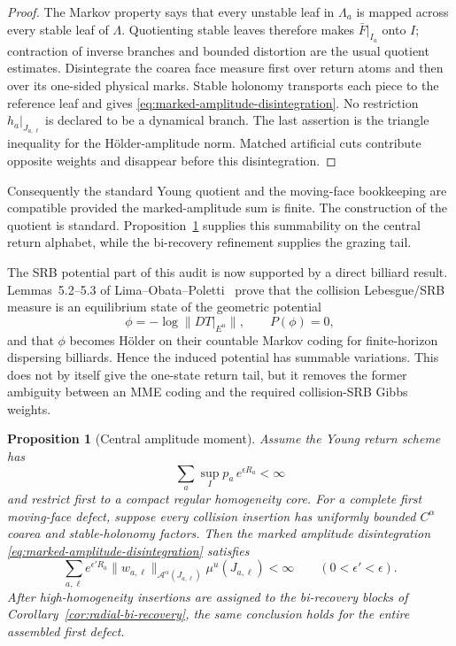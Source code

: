 \documentclass[11pt]{article}
\newtheorem{proposition}[theorem]{Proposition}
\begin{document}
\begin{proof}
The Markov property says that every unstable leaf in $\Lambda_a$ is mapped
across every stable leaf of $\Lambda$.  Quotienting stable leaves therefore
makes $\bar F|_{I_a}$ onto $I$; contraction of inverse branches and bounded
distortion are the usual quotient estimates.  Disintegrate the coarea face
measure first over return atoms and then over its one-sided physical marks.
Stable holonomy transports each piece to the reference leaf and gives
\eqref{eq:marked-amplitude-disintegration}.  No restriction
$h_a|_{J_{a,\ell}}$ is declared to be a dynamical branch.  The last assertion
is the triangle inequality for the H\"older-amplitude norm.  Matched
artificial cuts contribute opposite weights and disappear before this
disintegration.
\end{proof}

Consequently the standard Young quotient and the moving-face bookkeeping are
compatible provided the marked-amplitude sum is finite.  The construction of
the quotient is standard.  Proposition~\ref{prop:central-marked-moment}
supplies this summability on the central return alphabet, while the
bi-recovery refinement supplies the grazing tail.

The SRB potential part of this audit is now supported by a direct billiard
result.  Lemmas~5.2--5.3 of Lima--Obata--Poletti~\cite{LOP} prove that the
collision Lebesgue/SRB measure is an equilibrium state of the geometric
potential
\[
 \phi=-\log\|DT|_{E^u}\|,
 \qquad P(\phi)=0,
\]
and that $\phi$ becomes H\"older on their countable Markov coding for
finite-horizon dispersing billiards.  Hence the induced potential has
summable variations.  This does not by itself give the one-state return tail,
but it removes the former ambiguity between an MME coding and the required
collision-SRB Gibbs weights.

\begin{proposition}[Central amplitude moment]
\label{prop:central-marked-moment}
Assume the Young return scheme has
\[
 \sum_a\sup_I p_a\,e^{\epsilon R_a}<\infty
\]
and restrict first to a compact regular homogeneity core.  For a complete
first moving-face defect, suppose every collision insertion has uniformly
bounded $C^\alpha$ coarea and stable-holonomy factors.  Then the marked
amplitude disintegration \eqref{eq:marked-amplitude-disintegration} satisfies
\[
 \sum_{a,\ell}e^{\epsilon'R_a}
   \|w_{a,\ell}\|_{\mathcal A^\alpha(J_{a,\ell})}
   \mu^u(J_{a,\ell})<\infty
 \qquad(0<\epsilon'<\epsilon).
\]
After high-homogeneity insertions are assigned to the bi-recovery blocks of
Corollary~\ref{cor:radial-bi-recovery}, the same conclusion holds for the
entire assembled first defect.
\end{proposition}
\end{document}
